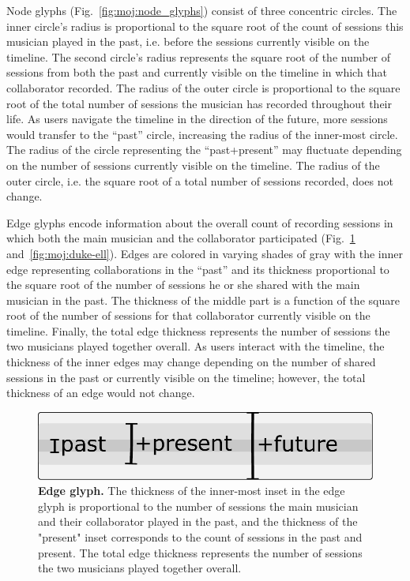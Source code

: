 \documentclass[12pt]{cmuthesis}
\begin{document}
  Node glyphs (Fig.~\ref{fig:moj:node_glyphs}) consist of three concentric circles.
  The inner circle's radius is proportional to the square root of the count of
  sessions this musician played in the past, i.e. before the sessions currently
  visible on the timeline. The second circle's radius represents the square root
  of  the number of sessions from both the past and currently visible on the
  timeline in which that collaborator recorded. The radius of the outer circle is
  proportional to the square root of the total number of sessions the musician has
  recorded throughout their life. As users navigate the timeline in the direction
  of the future, more sessions would transfer to the ``past'' circle, increasing
  the radius of the inner-most circle. The radius of the circle representing the
  ``past+present'' may fluctuate depending on the number of sessions currently
  visible on the timeline. The radius of the outer circle, i.e. the square root of
  a total number of sessions recorded, does not change.

  Edge glyphs encode information about the overall count of recording sessions in which both the main musician and the collaborator participated (Fig.~\ref{fig:moj:edge_glyphs} and~\ref{fig:moj:duke-ell}). Edges are colored in varying shades of gray with the inner edge representing collaborations in the ``past'' and its thickness proportional to the square root of the number of sessions he or she shared with the main musician in the past. The thickness of the middle part is a function of the square root of the number of sessions for that collaborator currently visible on the timeline. Finally, the total edge thickness represents the number of sessions the two musicians played together overall. As users interact with the timeline, the thickness of the inner edges may change depending on the number of shared sessions in the past or currently visible on the timeline; however, the total thickness of an edge would not change.

  \begin{figure}[ht]
    \centering
    \includegraphics[width=0.5\linewidth]{figures/edge-glyph}
    \caption{\textbf{Edge glyph.} The thickness of the inner-most inset in the edge glyph
  is proportional to the number of sessions the main musician and their
  collaborator played in the past, and the thickness of the "present" inset
  corresponds to the count of sessions in the past and present. The total edge
  thickness represents the number of sessions the two musicians played together
  overall.}
    \label{fig:moj:edge_glyphs}
  \end{figure}
\end{document}
